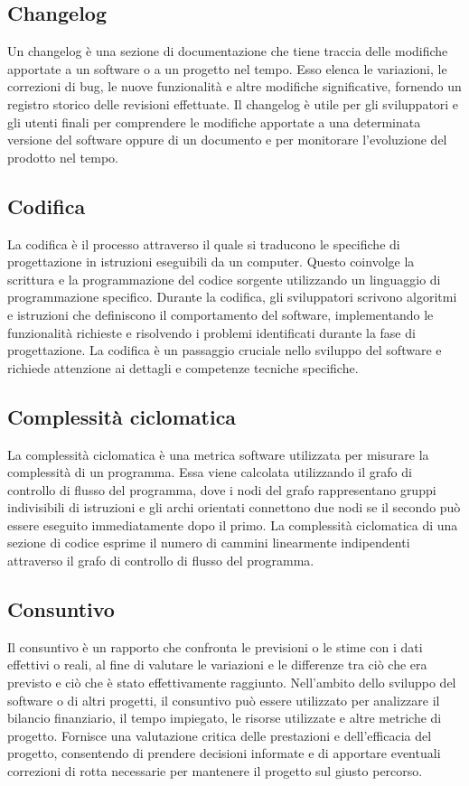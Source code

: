 \subsection*{Changelog} 
Un changelog è una sezione di documentazione che tiene traccia delle modifiche apportate a un software o a un progetto nel tempo. Esso elenca le variazioni, le correzioni di bug, le nuove funzionalità e altre modifiche significative, fornendo un registro storico delle revisioni effettuate. Il changelog è utile per gli sviluppatori e gli utenti finali per comprendere le modifiche apportate a una determinata versione del software oppure di un documento e per monitorare l'evoluzione del prodotto nel tempo.
\subsection*{Codifica} 
La codifica è il processo attraverso il quale si traducono le specifiche di progettazione in istruzioni eseguibili da un computer. Questo coinvolge la scrittura e la programmazione del codice sorgente utilizzando un linguaggio di programmazione specifico. Durante la codifica, gli sviluppatori scrivono algoritmi e istruzioni che definiscono il comportamento del software, implementando le funzionalità richieste e risolvendo i problemi identificati durante la fase di progettazione. La codifica è un passaggio cruciale nello sviluppo del software e richiede attenzione ai dettagli e competenze tecniche specifiche.
\subsection*{Complessità ciclomatica} 
La complessità ciclomatica è una metrica software utilizzata per misurare la complessità di un programma. Essa viene calcolata utilizzando il grafo di controllo di flusso del programma, dove i nodi del grafo rappresentano gruppi indivisibili di istruzioni e gli archi orientati connettono due nodi se il secondo può essere eseguito immediatamente dopo il primo. La complessità ciclomatica di una sezione di codice esprime il numero di cammini linearmente indipendenti attraverso il grafo di controllo di flusso del programma.
\subsection*{Consuntivo} 
Il consuntivo è un rapporto che confronta le previsioni o le stime con i dati effettivi o reali, al fine di valutare le variazioni e le differenze tra ciò che era previsto e ciò che è stato effettivamente raggiunto. Nell'ambito dello sviluppo del software o di altri progetti, il consuntivo può essere utilizzato per analizzare il bilancio finanziario, il tempo impiegato, le risorse utilizzate e altre metriche di progetto. Fornisce una valutazione critica delle prestazioni e dell'efficacia del progetto, consentendo di prendere decisioni informate e di apportare eventuali correzioni di rotta necessarie per mantenere il progetto sul giusto percorso.
